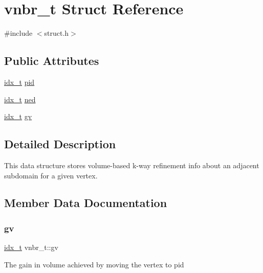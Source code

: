 \hypertarget{a00722}{}\section{vnbr\+\_\+t Struct Reference}
\label{a00722}


{\ttfamily \#include $<$struct.\+h$>$}

\subsection*{Public Attributes}
\begin{DoxyCompactItemize}
\item 
\hyperlink{a00876_aaa5262be3e700770163401acb0150f52}{idx\+\_\+t} \hyperlink{a00722_a93adf79b4e57cd0477e9afc9b25da653}{pid}
\item 
\hyperlink{a00876_aaa5262be3e700770163401acb0150f52}{idx\+\_\+t} \hyperlink{a00722_ae32050bde46f5545e1c306853afd8d97}{ned}
\item 
\hyperlink{a00876_aaa5262be3e700770163401acb0150f52}{idx\+\_\+t} \hyperlink{a00722_a29f3fc7f5d884e78e1dfff0f9cc438d0}{gv}
\end{DoxyCompactItemize}


\subsection{Detailed Description}
This data structure stores volume-\/based k-\/way refinement info about an adjacent subdomain for a given vertex. 

\subsection{Member Data Documentation}
\mbox{\label{a00722_a29f3fc7f5d884e78e1dfff0f9cc438d0}} 
\subsubsection{\texorpdfstring{gv}{gv}}
{\footnotesize\ttfamily \hyperlink{a00876_aaa5262be3e700770163401acb0150f52}{idx\+\_\+t} vnbr\+\_\+t\+::gv}

The gain in volume achieved by moving the vertex to pid \mbox{\label{a00722_ae32050bde46f5545e1c306853afd8d97}} 
